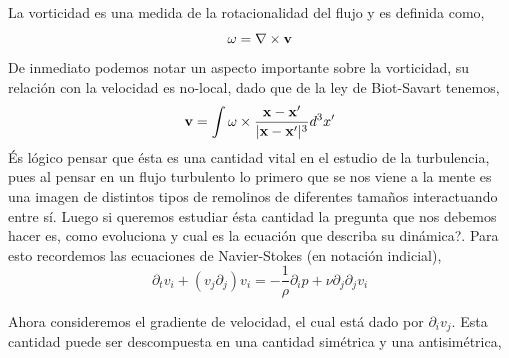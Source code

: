 \documentclass[executivepaper,12pt]{article}
\numberwithin{equation}{section}
\providecommand{\abs}[1]{\lvert#1\rvert}
\begin{document}
La vorticidad es una medida de la rotacionalidad del flujo y es definida como,
\begin{equation*}
	\vb{\omega}=\vb{\nabla}\times\vb{v}
\end{equation*}
De inmediato podemos notar un aspecto importante sobre la vorticidad, su relación con la velocidad es no-local, dado que de la ley de Biot-Savart tenemos,
\begin{equation*}
	\vb{v}=\int \vb{\omega}\times\frac{\vb{x}-\vb{x}'}{\abs{\vb{x}-\vb{x}'}^3} d^3x'
\end{equation*}
És lógico pensar que ésta es una cantidad vital en el estudio de la turbulencia, pues al pensar en un flujo turbulento lo primero que se nos viene a la mente es una imagen de distintos tipos de remolinos de diferentes tamaños interactuando entre sí. Luego si queremos estudiar ésta cantidad la pregunta que nos debemos hacer es, como evoluciona y cual es la ecuación que describa su dinámica?. Para esto recordemos las ecuaciones de Navier-Stokes (en notación indicial),
\begin{equation*}
	\partial_t v_i +(v_j\partial_j)v_i=-\frac{1}{\rho}\partial_i p + \nu\partial_j\partial_j v_i
\end{equation*} 

Ahora consideremos el gradiente de velocidad, el cual está dado por $\partial_i v_j$. Esta cantidad puede ser descompuesta en una cantidad simétrica y una antisimétrica, 
\end{document}
